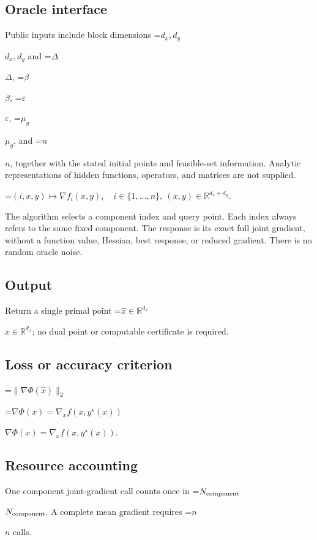 \documentclass[10pt,a4paper]{article}
\newcommand{\AtlasMath}[1]{\par\begingroup\centering\setbox0=\hbox{$\displaystyle #1$}\ifdim\wd0>1.4\linewidth\typeout{ATLAS WIDE FORMULA: \the\wd0}\fi\ifdim\wd0>\linewidth\resizebox{\linewidth}{!}{\box0}\else\box0\fi\par\endgroup}
\newcommand{\AtlasInlineMath}[1]{\begingroup\setbox0=\hbox{$#1$}\ifdim\wd0>.4\linewidth\endgroup\AtlasMath{#1}\else\endgroup$#1$\fi}
\begin{document}
\subsection{Oracle interface}


Public inputs include block dimensions \AtlasInlineMath{d_x,d_y} and \AtlasInlineMath{\Delta}, \AtlasInlineMath{\beta}, \AtlasInlineMath{\varepsilon}, \AtlasInlineMath{\mu_y}, and \AtlasInlineMath{n}, together with the stated initial points and feasible-set information. Analytic representations of hidden functions, operators, and matrices are not supplied.




\AtlasMath{(i,x,y)\longmapsto\nabla f_i(x,y),\quad i\in\{1,\ldots,n\},\ (x,y)\in\mathbb{R}^{d_x+d_y}.}




The algorithm selects a component index and query point. Each index always refers to the same fixed component. The response is its exact full joint gradient, without a function value, Hessian, best response, or reduced gradient. There is no random oracle noise.



\subsection{Output}


Return a single primal point \AtlasInlineMath{\widehat{x}\in\mathbb{R}^{d_x}}; no dual point or computable certificate is required.



\subsection{Loss or accuracy criterion}



\AtlasMath{\|\nabla\Phi(\widehat{x})\|_2}




\AtlasInlineMath{\nabla\Phi(x)=\nabla_x f(x,y^\star(x))}.



\subsection{Resource accounting}


One component joint-gradient call counts once in \AtlasInlineMath{N_{\rm component}}. A complete mean gradient requires \AtlasInlineMath{n} calls.
\end{document}
